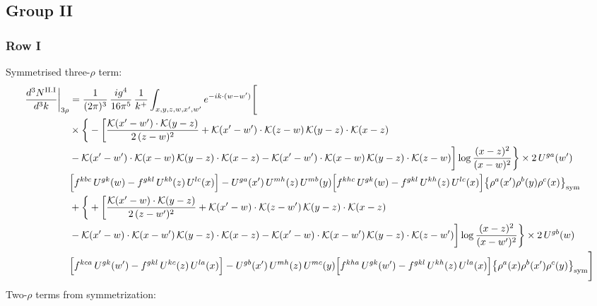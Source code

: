 \documentclass[9pt]{article}
\numberwithin{equation}{section}
\begin{document}
\subsection{Group II}
\subsubsection*{Row I}
Symmetrised three-$\rho$ term:
\begin{align}
\frac{d^{3}N^{\rm II.I}}{d^{3}k}\bigg|_{3\rho}&=\frac{1}{(2\pi)^{3}}\,\frac{ig^{4}}{16\pi^{5}}\,\frac{1}{k^{+}}\int_{x,y,z,w,x',w'}e^{-ik\cdot{(w-w')}}\Bigg[\notag\\
&\times\bigg\{-\bigg[\frac{\mathcal{K}(x'-w')\cdot\mathcal{K}(y-z)}{2\,(z-w)^{2}}+\mathcal{K}(x'-w')\cdot\mathcal{K}(z-w)\,\mathcal{K}(y-z)\cdot\mathcal{K}(x-z)\notag\\
&-\mathcal{K}(x'-w')\cdot\mathcal{K}(x-w)\,\mathcal{K}(y-z)\cdot\mathcal{K}(x-z)-\mathcal{K}(x'-w')\cdot\mathcal{K}(x-w)\,\mathcal{K}(y-z)\cdot\mathcal{K}(z-w)\bigg]\log\frac{(x-z)^{2}}{(x-w)^{2}}\bigg\}\times 2\,U^{ga}(w')\notag \\ & \Big[f^{kbc}\,U^{gk}(w)-f^{gkl}\,U^{kb}(z)\,U^{lc}(x)\Big]-U^{ga}(x')\,U^{mh}(z)\,U^{mb}(y)\Big[f^{khc}\,U^{gk}(w)-f^{gkl}\,U^{kh}(z)\,U^{lc}(x)\Big]\big\{\rho^{a}(x')\rho^{b}(y)\rho^{c}(x)\big\}_{\rm sym}\notag\\
&+\bigg\{+\bigg[\frac{\mathcal{K}(x'-w)\cdot\mathcal{K}(y-z)}{2\,(z-w')^{2}}+\mathcal{K}(x'-w)\cdot\mathcal{K}(z-w')\,\mathcal{K}(y-z)\cdot\mathcal{K}(x-z)\notag\\
&-\mathcal{K}(x'-w)\cdot\mathcal{K}(x-w')\,\mathcal{K}(y-z)\cdot\mathcal{K}(x-z)-\mathcal{K}(x'-w)\cdot\mathcal{K}(x-w')\,\mathcal{K}(y-z)\cdot\mathcal{K}(z-w')\bigg]\log\frac{(x-z)^{2}}{(x-w')^{2}}\bigg\}\times 2\,U^{gb}(w)\notag \\ & \Big[f^{kca}\,U^{gk}(w')-f^{gkl}\,U^{kc}(z)\,U^{la}(x)\Big]-U^{gb}(x')\,U^{mh}(z)\,U^{mc}(y)\Big[f^{kha}\,U^{gk}(w')-f^{gkl}\,U^{kh}(z)\,U^{la}(x)\Big]\big\{\rho^{a}(x)\rho^{b}(x')\rho^{c}(y)\big\}_{\rm sym}\Bigg]\label{eq:D-II.I-3}
\end{align}
Two-$\rho$ terms from symmetrization: 
\end{document}
